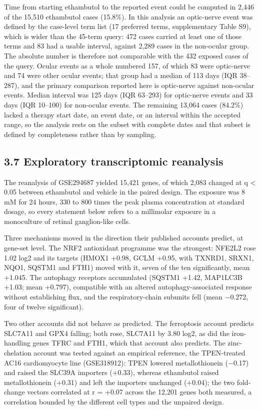 \documentclass[12pt,a4paper]{article}
\begin{document}
Time from starting ethambutol to the reported event could be computed in 2,446 of the 15,510 ethambutol cases (15.8\%). In this analysis an optic-nerve event was defined by the case-level term list (17 preferred terms, supplementary Table S9), which is wider than the 45-term query: 472 cases carried at least one of those terms and 83 had a usable interval, against 2,289 cases in the non-ocular group. The absolute number is therefore not comparable with the 432 exposed cases of the query. Ocular events as a whole numbered 157, of which 83 were optic-nerve and 74 were other ocular events; that group had a median of 113 days (IQR 38–287), and the primary comparison reported here is optic-nerve against non-ocular events. Median interval was 125 days (IQR 63–293) for optic-nerve events and 33 days (IQR 10–100) for non-ocular events. The remaining 13,064 cases (84.2\%) lacked a therapy start date, an event date, or an interval within the accepted range, so the analysis rests on the subset with complete dates and that subset is defined by completeness rather than by sampling.

\subsection*{3.7 Exploratory transcriptomic reanalysis}

The reanalysis of GSE294687 yielded 15,421 genes, of which 2,083 changed at q < 0.05 between ethambutol and vehicle in the paired design. The exposure was 8 mM for 24 hours, 330 to 800 times the peak plasma concentration at standard dosage, so every statement below refers to a millimolar exposure in a monoculture of retinal ganglion-like cells.

Three mechanisms moved in the direction their published accounts predict, at gene-set level. The NRF2 antioxidant programme was the strongest: NFE2L2 rose 1.02 log2 and its targets (HMOX1 +0.98, GCLM +0.95, with TXNRD1, SRXN1, NQO1, SQSTM1 and FTH1) moved with it, seven of the ten significantly, mean +1.045. The autophagy receptors accumulated (SQSTM1 +1.42, MAP1LC3B +1.03; mean +0.797), compatible with an altered autophagy-associated response without establishing flux, and the respiratory-chain subunits fell (mean −0.272, four of twelve significant).

Two other accounts did not behave as predicted. The ferroptosis account predicts SLC7A11 and GPX4 falling; both rose, SLC7A11 by 3.80 log2, as did the iron-handling genes TFRC and FTH1, which that account also predicts. The zinc-chelation account was tested against an empirical reference, the TPEN-treated AC16 cardiomyocyte line (GSE318912): TPEN lowered metallothionein (−0.17) and raised the SLC39A importers (+0.33), whereas ethambutol raised metallothionein (+0.31) and left the importers unchanged (+0.04); the two fold-change vectors correlated at r = +0.07 across the 12,201 genes both measured, a correlation bounded by the different cell types and the unpaired design.
\end{document}
